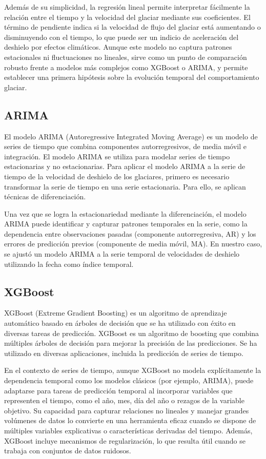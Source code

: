 \documentclass[sigconf,authordraft,language=spanish]{acmart}
\begin{document}
Además de su simplicidad, la regresión lineal permite interpretar fácilmente la relación entre el tiempo y la velocidad del glaciar mediante sus coeficientes. 
El término de pendiente indica si la velocidad de flujo del glaciar está aumentando o disminuyendo con el tiempo, lo que puede ser un indicio
 de aceleración del deshielo por efectos climáticos. Aunque este modelo no captura patrones estacionales ni fluctuaciones no lineales, sirve como un punto 
 de comparación robusto frente a modelos más complejos como XGBoost o ARIMA, y permite establecer una primera hipótesis sobre la evolución
  temporal del comportamiento glaciar.

\subsection{ARIMA}

El modelo ARIMA (Autoregressive Integrated Moving Average) es un modelo de series de tiempo que combina componentes autorregresivos, de media móvil e integración.
El modelo ARIMA se utiliza para modelar series de tiempo estacionarias y no estacionarias.
Para aplicar el modelo ARIMA a la serie de tiempo de la velocidad de deshielo de los glaciares, primero es necesario transformar la serie de tiempo en una serie estacionaria.
Para ello, se aplican técnicas de diferenciación.

Una vez que se logra la estacionariedad mediante la diferenciación, el modelo ARIMA puede identificar y capturar patrones temporales en la serie, como la dependencia 
entre observaciones pasadas (componente autorregresiva, AR) y los errores de predicción previos (componente de media móvil, MA). En nuestro caso, se ajustó un modelo ARIMA a 
la serie temporal de velocidades de deshielo utilizando la fecha como índice temporal.

\subsection{XGBoost}

XGBoost (Extreme Gradient Boosting) es un algoritmo de aprendizaje automático basado en árboles de decisión que se ha utilizado con éxito en diversas tareas de predicción.
XGBoost es un algoritmo de boosting que combina múltiples árboles de decisión para mejorar la precisión de las predicciones.
Se ha utilizado en diversas aplicaciones, incluida la predicción de series de tiempo.

En el contexto de series de tiempo, aunque XGBoost no modela explícitamente la dependencia temporal como los modelos clásicos (por ejemplo, ARIMA), puede adaptarse para tareas de 
predicción temporal al incorporar variables que representen el tiempo, como el año, mes, día del año o rezagos de la variable objetivo. Su capacidad para capturar relaciones no lineales
 y manejar grandes volúmenes de datos lo convierte en una herramienta eficaz cuando se dispone de múltiples variables explicativas o características derivadas del tiempo. Además, XGBoost
incluye mecanismos de regularización, lo que resulta útil cuando se trabaja con conjuntos de datos ruidosos.
\end{document}
